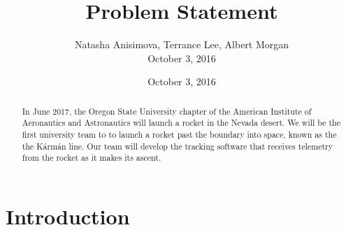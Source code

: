 \documentclass[letterpaper,10pt,draftclsnofoot,onecolumn]{IEEEtran}
\title{Problem Statement}
\date{October 3, 2016}
\author{Natasha Anisimova, Terrance Lee, Albert Morgan
	
	October 3, 2016}
\begin{document}
\maketitle
	\tableofcontents


\begin{abstract}
In June 2017, the Oregon State University chapter of the
American Institute of Aeronautics and Astronautics will launch a rocket in the Nevada desert.
We will be the first university team to to launch a rocket past the boundary into space,
known as the the K\'{a}rm\'{a}n line.
Our team will develop the tracking software that receives
telemetry from the rocket as it makes its ascent.
\end{abstract}
	
	\section{Introduction}
	
	
\end{document}
